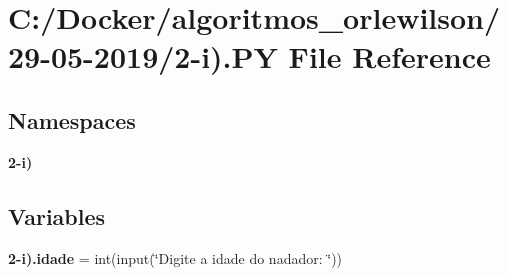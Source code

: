 \section{C\+:/\+Docker/algoritmos\+\_\+orlewilson/29-\/05-\/2019/2-\/i).PY File Reference}
\label{2-i_08_8_p_y}
\subsection*{Namespaces}
\begin{DoxyCompactItemize}
\item 
 \textbf{ 2-\/i)}
\end{DoxyCompactItemize}
\subsection*{Variables}
\begin{DoxyCompactItemize}
\item 
\textbf{ 2-\/i).\+idade} = int(input(\char`\"{}Digite a idade do nadador\+: \char`\"{}))
\end{DoxyCompactItemize}
